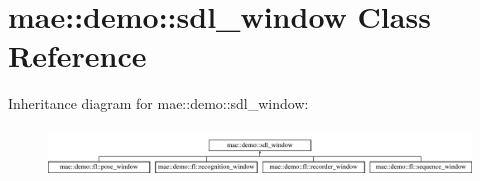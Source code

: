 \hypertarget{classmae_1_1demo_1_1sdl__window}{\section{mae\-:\-:demo\-:\-:sdl\-\_\-window Class Reference}
\label{classmae_1_1demo_1_1sdl__window}
}
Inheritance diagram for mae\-:\-:demo\-:\-:sdl\-\_\-window\-:\begin{figure}[H]
\begin{center}
\leavevmode
\includegraphics[height=1.333333cm]{classmae_1_1demo_1_1sdl__window}
\end{center}
\end{figure}
